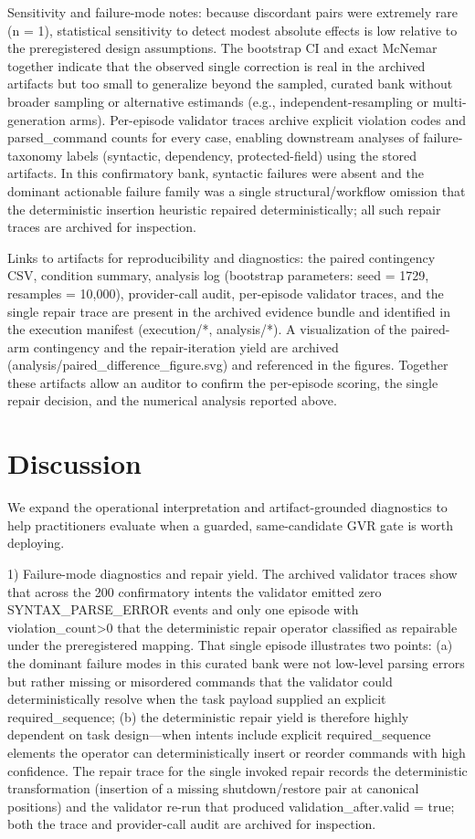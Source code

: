 \documentclass[conference]{IEEEtran}
\begin{document}
Sensitivity and failure-mode notes: because discordant pairs were extremely rare (n = 1), statistical sensitivity to detect modest absolute effects is low relative to the preregistered design assumptions. The bootstrap CI and exact McNemar together indicate that the observed single correction is real in the archived artifacts but too small to generalize beyond the sampled, curated bank without broader sampling or alternative estimands (e.g., independent-resampling or multi-generation arms). Per-episode validator traces archive explicit violation codes and parsed\_command counts for every case, enabling downstream analyses of failure-taxonomy labels (syntactic, dependency, protected-field) using the stored artifacts. In this confirmatory bank, syntactic failures were absent and the dominant actionable failure family was a single structural/workflow omission that the deterministic insertion heuristic repaired deterministically; all such repair traces are archived for inspection.

Links to artifacts for reproducibility and diagnostics: the paired contingency CSV, condition summary, analysis log (bootstrap parameters: seed = 1729, resamples = 10,000), provider-call audit, per-episode validator traces, and the single repair trace are present in the archived evidence bundle and identified in the execution manifest (execution/*, analysis/*). A visualization of the paired-arm contingency and the repair-iteration yield are archived (analysis/paired\_difference\_figure.svg) and referenced in the figures. Together these artifacts allow an auditor to confirm the per-episode scoring, the single repair decision, and the numerical analysis reported above.

\section{Discussion}
We expand the operational interpretation and artifact-grounded diagnostics to help practitioners evaluate when a guarded, same-candidate GVR gate is worth deploying.

1) Failure-mode diagnostics and repair yield. The archived validator traces show that across the 200 confirmatory intents the validator emitted zero SYNTAX\_PARSE\_ERROR events and only one episode with violation\_count>0 that the deterministic repair operator classified as repairable under the preregistered mapping. That single episode illustrates two points: (a) the dominant failure modes in this curated bank were not low-level parsing errors but rather missing or misordered commands that the validator could deterministically resolve when the task payload supplied an explicit required\_sequence; (b) the deterministic repair yield is therefore highly dependent on task design---when intents include explicit required\_sequence elements the operator can deterministically insert or reorder commands with high confidence. The repair trace for the single invoked repair records the deterministic transformation (insertion of a missing shutdown/restore pair at canonical positions) and the validator re-run that produced validation\_after.valid = true; both the trace and provider-call audit are archived for inspection.
\end{document}
